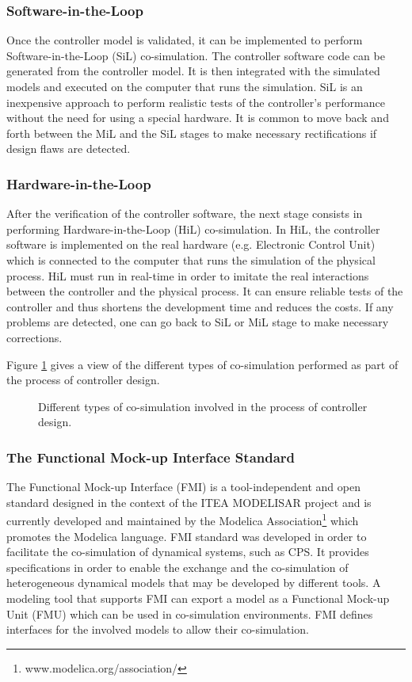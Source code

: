 \subsubsection{Software-in-the-Loop}

Once the controller model is validated, it can be implemented to perform Software-in-the-Loop (SiL) co-simulation. The controller software code can be generated from the controller model. It is then integrated with the simulated models and executed on the computer that runs the simulation. SiL is an inexpensive approach to perform realistic tests of the controller’s performance without the need for using a special hardware. It is common to move back and forth between the MiL and the SiL stages to make necessary rectifications if design flaws are detected.

\subsubsection{Hardware-in-the-Loop}

After the verification of the controller software, the next stage consists in performing Hardware-in-the-Loop (HiL) co-simulation. In HiL, the controller software is implemented on the real hardware (e.g. Electronic Control Unit) which is connected to the computer that runs the simulation of the physical process. HiL must run in real-time in order to imitate the real interactions between the controller and the physical process. It can ensure reliable tests of the controller and thus shortens the development time and reduces the costs. If any problems are detected, one can go back to SiL or MiL stage to make necessary corrections.

Figure \ref{fig:mbd} gives a view of the different types of co-simulation performed as part of the process of controller design.

\begin{figure}[phbt]
\centering

\caption{Different types of co-simulation involved in the process of controller design.}
\label{fig:mbd}
\end{figure}


\subsubsection{The Functional Mock-up Interface Standard}

The Functional Mock-up Interface (FMI) is a tool-independent and open standard designed in the context of the ITEA MODELISAR project and is currently developed and maintained by the Modelica Association\footnote{www.modelica.org/association/} which promotes the Modelica language. FMI standard was developed in order to facilitate the co-simulation of dynamical systems, such as CPS. It provides specifications in order to enable the exchange and the co-simulation of heterogeneous dynamical models that may be developed by different tools. A modeling tool that supports FMI can export a model as a Functional Mock-up Unit (FMU) which can be used in co-simulation environments. FMI defines interfaces for the involved models to allow their co-simulation.

